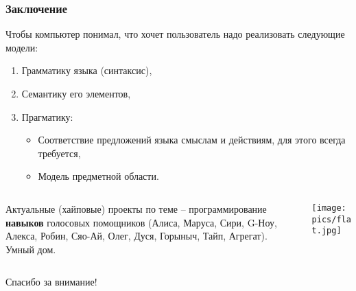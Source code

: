 \documentclass[10pt]{beamer}
\begin{document}
\begin{frame}
  \frametitle{Заключение}
  Чтобы компьютер понимал, что хочет пользователь надо реализовать следующие модели:
  \begin{enumerate}
  \item Грамматику языка (синтаксис),
  \item Семантику его элементов,
  \item Прагматику:
    \begin{itemize}
    \item Соответствие предложений языка смыслам и действиям, для этого всегда требуется,
    \item Модель предметной области.
    \end{itemize}
  \end{enumerate}
  \begin{columns}
    \begin{column}{0.5\linewidth}
      Актуальные (хайповые) проекты по теме -- программирование \textbf{навыков} голосовых помощников (Алиса, Маруса, Сири, G-Ноу, Алекса, Робин, Сяо-Ай, Олег, Дуся, Горыныч, Тайп, Агрегат).\\[1em]
      Умный дом.
    \end{column}
    \begin{column}{0.6\linewidth}
      \texttt{[image: pics/flat.jpg]}
    \end{column}
  \end{columns}
\end{frame}

\begin{frame}
  \vfill
  \begin{center}
    {\Huge Спасибо за внимание!}
  \end{center}
  \vfill
\end{frame}
\end{document}
